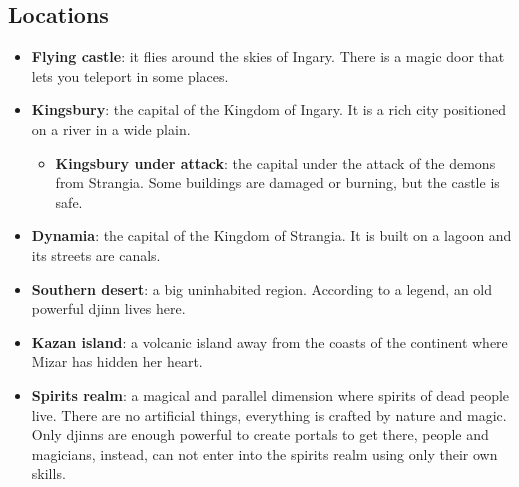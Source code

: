 \subsection{Locations}
\begin{itemize}
	\item \textbf{Flying castle}: it flies around the skies of Ingary. There is a magic door that lets you teleport in some places.
	
	\item \textbf{Kingsbury}: the capital of the Kingdom of Ingary. It is a rich city positioned on a river in a wide plain.
	
\begin{itemize}
	\item \textbf{Kingsbury under attack}: the capital under the attack of the demons from Strangia. Some buildings are damaged or burning, but the castle is safe.
\end{itemize}
	
	\item \textbf{Dynamia}: the capital of the Kingdom of Strangia. It is built on a lagoon and its streets are canals.
	
	\item \textbf{Southern desert}: a big uninhabited region. According to a legend, an old powerful djinn lives here.
	
	\item \textbf{Kazan island}: a volcanic island away from the coasts of the continent where Mizar has hidden her heart.
	
	\item \textbf{Spirits realm}: a magical and parallel dimension where spirits of dead people live. There are no artificial things, everything is crafted by nature and magic. Only djinns are enough powerful to create portals to get there, people and magicians, instead, can not enter into the spirits realm using only their own skills.

\end{itemize}
